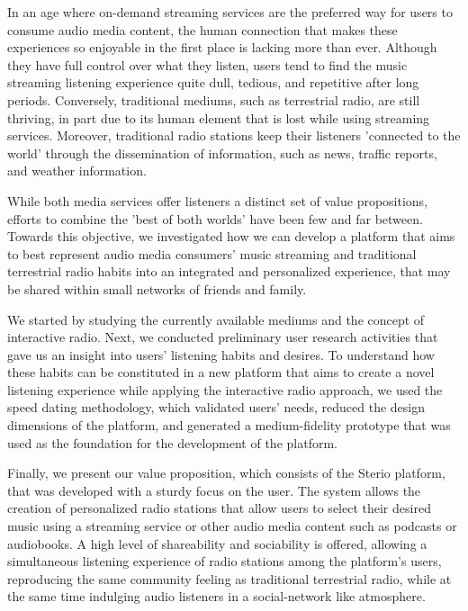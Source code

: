 \label{chap:conclusion}

In an age where on-demand streaming services are the preferred way for users to consume audio media content, the human connection that makes these experiences so enjoyable in the first place is lacking more than ever. Although they have full control over what they listen, users tend to find the music streaming listening experience quite dull, tedious, and repetitive after long periods. Conversely, traditional mediums, such as terrestrial radio, are still thriving, in part due to its human element that is lost while using streaming services. Moreover, traditional radio stations keep their listeners 'connected to the world' through the dissemination of information, such as news, traffic reports, and weather information. 

While both media services offer listeners a distinct set of value propositions, efforts to combine the ’best of both worlds’ have been few and far between. Towards this objective, we investigated how we can develop a platform that aims to best represent audio media consumers’ music streaming and traditional terrestrial radio habits into an integrated and personalized experience, that may be shared within small networks of friends and family.

We started by studying the currently available mediums and the concept of interactive radio. Next, we conducted preliminary user research activities that gave us an insight into users’ listening habits and desires. To understand how these habits can be constituted in a new platform that aims to create a novel listening experience while applying the interactive radio approach, we used the speed dating methodology, which validated users' needs, reduced the design dimensions of the platform, and generated a medium-fidelity prototype that was used as the foundation for the development of the platform. 

Finally, we present our value proposition, which consists of the Sterio platform, that was developed with a sturdy focus on the user. The system allows the creation of personalized radio stations that allow users to select their desired music using a streaming service or other audio media content such as podcasts or audiobooks. A high level of shareability and sociability is offered, allowing a simultaneous listening experience of radio stations among the platform's users, reproducing the same community feeling as traditional terrestrial radio, while at the same time indulging audio listeners in a social-network like atmosphere.

